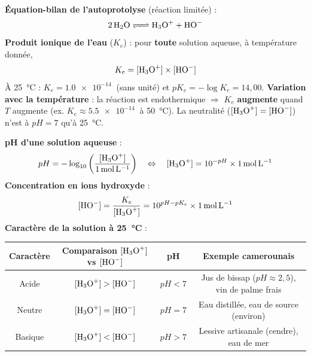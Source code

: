 \documentclass[11pt]{article}
\begin{document}
\begin{propriete}
\textbf{Équation-bilan de l'autoprotolyse} (réaction limitée) :
\[ \ce{2 H2O <=> H3O+ + HO-} \]
\textbf{Produit ionique de l'eau} ($K_e$) : pour \textbf{toute} solution aqueuse, à température donnée,
\[ K_e = [\ce{H3O+}] \times [\ce{HO-}] \]
À \SI{25}{\celsius} : $K_e = \SI{1,0e-14}{}$ (sans unité) et $pK_e = -\log K_e = 14,00$.
\textbf{Variation avec la température} : la réaction est endothermique $\Rightarrow$ $K_e$ \textbf{augmente} quand $T$ augmente (ex. $K_e \approx \SI{5,5e-14}{}$ à \SI{50}{\celsius}). La neutralité ($[\ce{H3O+}]=[\ce{HO-}]$) n'est à $pH=7$ qu'à \SI{25}{\celsius}.

\medskip
\textbf{pH d'une solution aqueuse} :
\[ pH = -\log_{10}\left( \frac{[\ce{H3O+}]}{\SI{1}{mol.L^{-1}}} \right) \quad \Leftrightarrow \quad [\ce{H3O+}] = 10^{-pH} \times \SI{1}{mol.L^{-1}} \]
\textbf{Concentration en ions hydroxyde} :
\[ [\ce{HO-}] = \frac{K_e}{[\ce{H3O+}]} = 10^{pH-pK_e} \times \SI{1}{mol.L^{-1}} \]
\textbf{Caractère de la solution à \SI{25}{\celsius}} :
\begin{center}
\begin{tabular}{|c|c|c|c|}\hline
\rowcolor{popblueL} \textbf{Caractère} & \textbf{Comparaison $[\ce{H3O+}]$ vs $[\ce{HO-}]$} & \textbf{pH} & \textbf{Exemple camerounais} \\\hline
Acide & $[\ce{H3O+}] > [\ce{HO-}]$ & $pH < 7$ & Jus de bissap ($pH \approx 2,5$), vin de palme frais \\\hline
Neutre & $[\ce{H3O+}] = [\ce{HO-}]$ & $pH = 7$ & Eau distillée, eau de source (environ) \\\hline
Basique & $[\ce{H3O+}] < [\ce{HO-}]$ & $pH > 7$ & Lessive artisanale (cendre), eau de mer \\\hline
\end{tabular}
\end{center}
\end{propriete}
\end{document}
